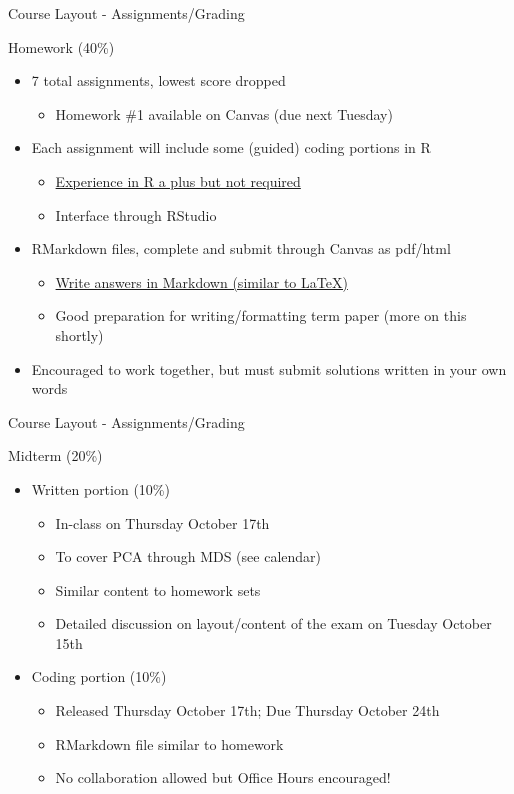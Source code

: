 \documentclass{beamer}
\begin{document}
\begin{frame}{Course Layout - Assignments/Grading}
\begin{block}{Homework (40\%) }
\begin{itemize}
\item 7 total assignments, lowest score dropped
	\begin{itemize}
		\item Homework \#1 available on Canvas (due next Tuesday)
	\end{itemize}
\item Each assignment will include some (guided) coding portions in R
	\begin{itemize}
		\item \underline{Experience in R a plus but not required}
		\item Interface through RStudio
	\end{itemize}
\item RMarkdown files, complete and submit through Canvas as pdf/html
	\begin{itemize}
		\item \underline{Write answers in Markdown (similar to \LaTeX)}
		\item Good preparation for writing/formatting term paper (more on this shortly)
	\end{itemize}
\item Encouraged to work together, but must submit solutions written in your own words
\end{itemize}
\end{block}


\end{frame}


\begin{frame}{Course Layout - Assignments/Grading}
\begin{block}{Midterm (20\%)}
\begin{itemize}
\item Written portion (10\%)
	\begin{itemize}
		\item In-class on Thursday October 17th
		\item To cover PCA through MDS (see calendar)
		\item Similar content to homework sets
		\item Detailed discussion on layout/content of the exam on Tuesday October 15th
	\end{itemize}
\item Coding portion (10\%)
	\begin{itemize}
		\item Released Thursday October 17th; Due Thursday October 24th
		\item RMarkdown file similar to homework
		\item No collaboration allowed but Office Hours encouraged!
	\end{itemize}
\end{itemize}
\end{block}

\end{frame}
\end{document}

